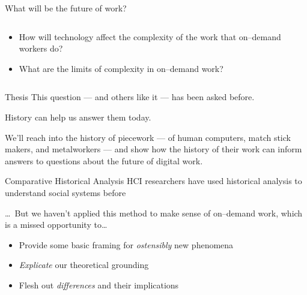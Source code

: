 \documentclass[presentation]{subfiles}
\begin{document}
\begin{frame}{What will be the future of work?}
  \begin{columns}
    \begin{column}{0.6\textwidth}
      \begin{itemize}
        \item<1-> How will \alert{technology} affect the complexity of the work that on--demand workers do?
        \item<2-> What are the \alert{limits} of complexity in on--demand work?
      \end{itemize}
    \end{column}
    \begin{column}{0.4\textwidth}
    \end{column}
    \end{columns}
\end{frame}


\begin{frame}{Thesis}
    This question --- and others like it --- has been asked before.

    History can help us answer them today.

    We'll reach into the history of \alert{piecework}
    --- of human computers, match stick makers, and metalworkers ---
    and show how the \alert{history} of their work can
    inform answers to questions about the \alert{future} of digital work.
\end{frame}



\begin{frame}{Comparative Historical Analysis}
  HCI researchers have used \alert{historical analysis} to understand social systems before\par
  \scriptsize{\textcite{Wyche2006,bodker1993historical}\par}\normalsize{}
  
  \dots~But we haven't applied this method to make sense of on--demand work,
        which is a missed opportunity to\dots
  \begin{itemize}
    \item Provide some basic framing for \emph{ostensibly} new phenomena
    \item \emph{Explicate} our theoretical grounding
    \item Flesh out \emph{differences} and their implications
  \end{itemize}
\end{frame}

\notinsubfile{
  
}
\end{document}
